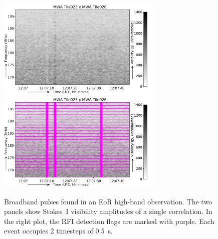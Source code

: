 \documentclass{pasa}
\begin{document}
\noindent\begin{figure}%
\begin{center}\hspace*{-0.2cm}\includegraphics[width=8cm]{img/broadband-pulse-unflagged}\includegraphics[width=8cm]{img/broadband-pulse-flagged}
\end{center}
\caption{Broadband pulses found in an EoR high-band observation. The two panels show Stokes~I visibility amplitudes of a single correlation. In the right plot, the RFI detection flags are marked with purple. Each event occupies 2 timesteps of 0.5~s.}
\label{fig:broadband-pulse}
\end{figure}
\end{document}
